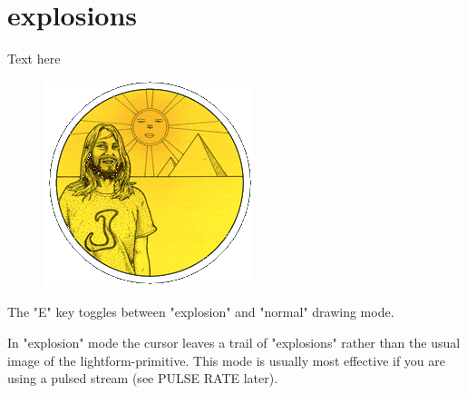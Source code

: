 \chapter{explosions} 
\label{sec:presets}
\lstset{style=6502Style}
Text here
\begin{definition}
\setlength{\intextsep}{0pt}%
\setlength{\columnsep}{3pt}%
\begin{figure}
\includegraphics[width=\linewidth]{src/callout/psych.png} 
\end{figure}
\small
The "E" key toggles between "explosion" and "normal" drawing mode.

In "explosion" mode the cursor leaves a trail of "explosions" rather than the
usual image of the lightform-primitive.  This mode is usually most effective if
you are using a pulsed stream (see PULSE RATE later).
\end{definition}
\clearpage

